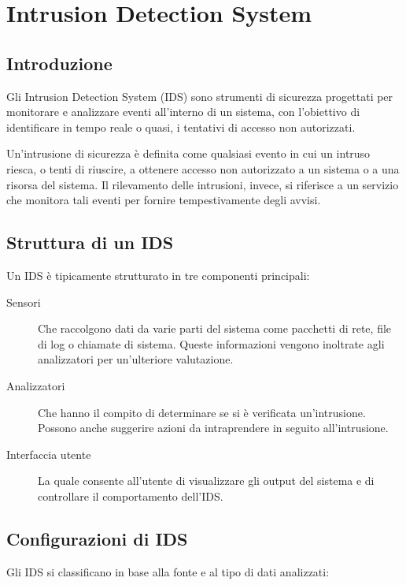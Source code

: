 \chapter{Intrusion Detection System}

\section{Introduzione}

Gli Intrusion Detection System (IDS) sono strumenti di sicurezza progettati per monitorare e analizzare eventi all'interno di un sistema, con l'obiettivo di identificare in tempo reale o quasi, i tentativi di accesso non autorizzati.

Un'intrusione di sicurezza è definita come qualsiasi evento in cui un intruso riesca, o tenti di riuscire, a ottenere accesso non autorizzato a un sistema o a una risorsa del sistema. Il rilevamento delle intrusioni, invece, si riferisce a un servizio che monitora tali eventi per fornire tempestivamente degli avvisi.

\section{Struttura di un IDS}

Un IDS è tipicamente strutturato in tre componenti principali:

\begin{description}
    \item[Sensori] Che raccolgono dati da varie parti del sistema come pacchetti di rete, file di log o chiamate di sistema. Queste informazioni vengono inoltrate agli analizzatori per un'ulteriore valutazione.
    
    \item[Analizzatori] Che hanno il compito di determinare se si è verificata un'intrusione. Possono anche suggerire azioni da intraprendere in seguito all'intrusione.
    
    \item[Interfaccia utente] La quale consente all'utente di visualizzare gli output del sistema e di controllare il comportamento dell'IDS.
\end{description}

\section{Configurazioni di IDS}

Gli IDS si classificano in base alla fonte e al tipo di dati analizzati:


